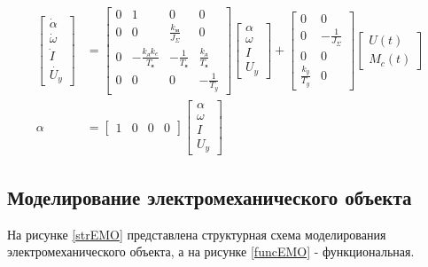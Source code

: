 \documentclass[a4paper, 12pt]{article}
\begin{document}
	\begin{align}
		\begin{bmatrix}
			\dot{\alpha} \\
			\dot{\omega} \\
			\dot{I} \\
			\dot{U_y} 
		\end{bmatrix} & = 
		\begin{bmatrix}
			0 & 1 & 0 & 0 \\
			0 & 0 & \frac{k_\text{м}}{J_\Sigma} & 0 \\
			0 & -\frac{k_\text{д}k_e}{T_\text{я}} & - \frac{1}{T_\text{я}} & \frac{k_\text{д}}{T_\text{я}} \\
			0 & 0 & 0 & -\frac{1}{T_y}
		\end{bmatrix}
		\begin{bmatrix}
			\alpha \\
			\omega \\
			I \\
			U_y 
		\end{bmatrix} + 
		\begin{bmatrix}
			0 & 0 \\
			0 & - \frac{1}{J_\Sigma} \\
			0 & 0 \\
			\frac{k_y}{T_y} & 0
		\end{bmatrix}
		\begin{bmatrix}
			U(t) \\
			M_c(t)
		\end{bmatrix} \\
		\alpha & = 
		\begin{bmatrix}
			1 & 0 & 0 & 0
		\end{bmatrix}
		\begin{bmatrix}
			\alpha \\
			\omega \\
			I \\
			U_y 
		\end{bmatrix}
	\end{align}
	
\newpage

\begin{center}
	\section{Моделирование электромеханического объекта}
\end{center}
На рисунке \ref{strEMO} представлена структурная схема моделирования электромеханического объекта, а на рисунке \ref{funcEMO}  - функциональная.
\end{document}
